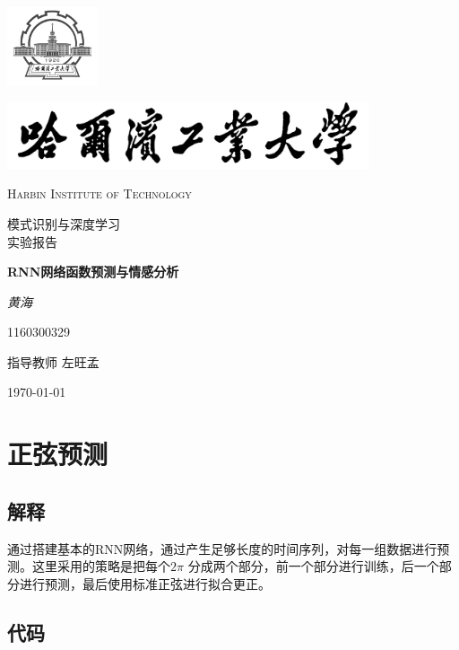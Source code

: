 \documentclass[12pt, a4paper]{report}
\begin{document}
 
\begin{titlepage}
	\centering
	\includegraphics[width=0.2\textwidth]{sf1.png}\par
	\vspace{1cm}
	\includegraphics[width=0.8\textwidth]{sf.jpg}\par
	\vspace{0.1cm}
	{\scshape\LARGE Harbin Institute of Technology \par}
	\vspace{1cm}
	{\kaishu\LARGE 模式识别与深度学习\\实验报告\par}
	\vspace{1.5cm}
	{\huge\bfseries RNN网络函数预测与情感分析\par}
	\vspace{2cm}
	{\fangsong\Large\itshape 黄海\par}
	\vfill
	{1160300329}\par
	\vfill
	指导教师	\textsc{左旺孟}
	\vfill
	{\large \today\par}
\end{titlepage}



\sc
\tableofcontents
\newpage
\chapter{正弦预测}
\section{解释}

通过搭建基本的RNN网络，通过产生足够长度的时间序列，对每一组数据进行预测。这里采用的策略是把每个$2\pi$
分成两个部分，前一个部分进行训练，后一个部分进行预测，最后使用标准正弦进行拟合更正。

\section{代码}
\end{document}

